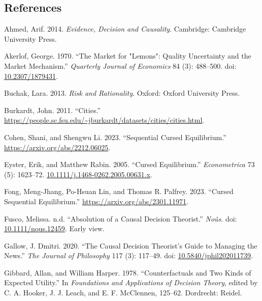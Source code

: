\documentclass[
  10pt,
  letterpaper,
  DIV=11,
  numbers=noendperiod,
  twoside]{scrartcl}
\newlength{\cslhangindent}
\newenvironment{CSLReferences}[2] %
 {\begin{list}{}{%
  \setlength{\itemindent}{0pt}
  \setlength{\leftmargin}{0pt}
  \setlength{\parsep}{0pt}
  \ifodd #1
   \setlength{\leftmargin}{\cslhangindent}
   \setlength{\itemindent}{-1\cslhangindent}
  \fi
  \setlength{\itemsep}{#2\baselineskip}}}
 {\end{list}}
\begin{document}
\subsection*{References}\label{references}

\label{refs}
\begin{CSLReferences}{1}{0}
Ahmed, Arif. 2014. \emph{Evidence, Decision and Causality}. Cambridge:
{C}ambridge {U}niversity {P}ress.

Akerlof, George. 1970. {``The Market for "Lemons": Quality Uncertainty
and the Market Mechanism.''} \emph{Quarterly Journal of Economics} 84
(3): 488--500. doi:
\href{https://doi.org/10.2307/1879431}{10.2307/1879431}.

Buchak, Lara. 2013. \emph{Risk and Rationality}. Oxford: Oxford
University Press.

Burkardt, John. 2011. {``Cities.''}
\url{https://people.sc.fsu.edu/~jburkardt/datasets/cities/cities.html}.

Cohen, Shani, and Shengwu Li. 2023. {``Sequential Cursed Equilibrium.''}
\url{https://arxiv.org/abs/2212.06025}.

Eyster, Erik, and Matthew Rabin. 2005. {``Cursed Equilibrium.''}
\emph{Econometrica} 73 (5): 1623--72.
\href{https://10.1111/j.1468-0262.2005.00631.x}{10.1111/j.1468-0262.2005.00631.x}.

Fong, Meng-Jhang, Po-Hsuan Lin, and Thomas R. Palfrey. 2023. {``Cursed
Sequential Equilibrium.''} \url{https://arxiv.org/abs/2301.11971}.

Fusco, Melissa. n.d. {``Absolution of a Causal Decision Theorist.''}
\emph{No{û}s}. doi:
\href{https://doi.org/10.1111/nous.12459}{10.1111/nous.12459}. Early
view.

Gallow, J. Dmitri. 2020. {``The Causal Decision Theorist's Guide to
Managing the News.''} \emph{The Journal of Philosophy} 117 (3): 117--49.
doi:
\href{https://doi.org/10.5840/jphil202011739}{10.5840/jphil202011739}.

Gibbard, Allan, and William Harper. 1978. {``Counterfactuals and Two
Kinds of Expected Utility.''} In \emph{Foundations and Applications of
Decision Theory}, edited by C. A. Hooker, J. J. Leach, and E. F.
McClennen, 125--62. Dordrecht: Reidel.


\end{CSLReferences}
\end{document}
